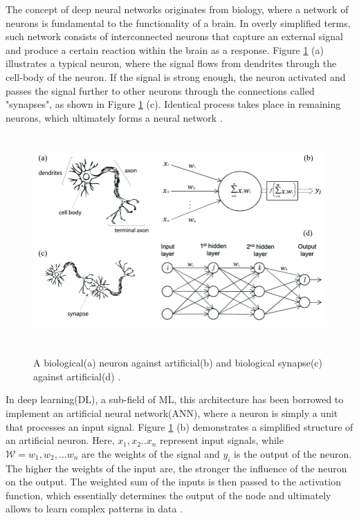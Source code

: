 The concept of deep neural networks originates from biology, where a network of neurons is fundamental to the functionality of a brain. In overly simplified terms, such network consists of interconnected neurons that capture an external signal and produce a certain reaction within the brain as a response. Figure \ref{NeuronSchem} (a) illustrates a typical neuron, where the signal flows from dendrites through the cell-body of the neuron. If the signal is strong enough, the neuron activated and passes the signal further to other neurons through the connections called "synapses", as shown in Figure \ref{NeuronSchem} (c). Identical process takes place in remaining neurons, which ultimately forms a neural network \cite{Mehlig_2021}.

\begin{figure}[htb]
	\begin{center}
		\includegraphics[height=8cm]{./BioNeuronVsArtificial.png}
	\end{center}
	\caption{A biological(a) neuron against artificial(b) and biological synapse(c) against artificial(d) \cite{article1}.}
	\begin{center}
		\label{NeuronSchem}
	\end{center}
\end{figure}

In deep learning(DL), a sub-field of ML, this architecture has been borrowed to implement an artificial neural network(ANN), where a neuron is simply a unit that processes an input signal. Figure \ref{NeuronSchem} (b) demonstrates a simplified structure of an artificial neuron. Here, $x_1, x_2..x_n$ represent input signals, while $\mathcal{W} = w_1, w_2, ... w_n$ are the weights of the signal and $y_i$ is the output of the neuron. The higher the weights of the input are, the stronger the influence of the neuron on the output. The weighted sum of the inputs is then passed to the activation function, which essentially determines the output of the node and ultimately allows to learn complex patterns in data \cite{Mehlig_2021}. 

